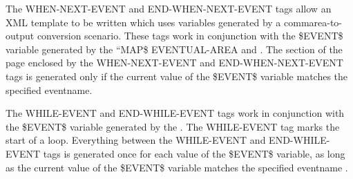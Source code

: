 \documentclass[letterpaper,10pt,english]{sphinxmanual}
\begin{document}

\begin{sphinxVerbatim}[commandchars=\\\{\}]
 
 
\end{sphinxVerbatim}

The WHEN-NEXT-EVENT and END-WHEN-NEXT-EVENT tags allow an XML template to be written which uses variables generated by a commarea-to-output conversion scenario. These tags work in conjunction with the \$EVENT\$ variable generated by the “MAP\$ EVENTUAL-AREA and {\hyperref[\detokenize{User_Guide:v457ug-map-eventual-elsethen}]{}}. The section of the page enclosed by the WHEN-NEXT-EVENT and END-WHEN-NEXT-EVENT tags is generated only if the current value of the \$EVENT\$ variable matches the specified eventname.


\begin{sphinxVerbatim}[commandchars=\\\{\}]
 
 
\end{sphinxVerbatim}

The WHILE-EVENT and END-WHILE-EVENT tags work in conjunction with the \$EVENT\$ variable generated by the {\hyperref[\detokenize{User_Guide:v457ug-map-eventual-elsethen}]{}}. The WHILE-EVENT tag marks the start of a loop. Everything between the WHILE-EVENT and END-WHILE-EVENT tags is generated once for each value of the \$EVENT\$ variable, as long as the current value of the \$EVENT\$ variable matches the specified eventname
.
\end{document}
